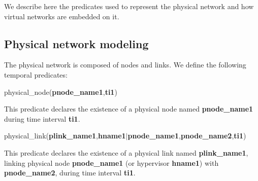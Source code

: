 We describe here the predicates used to represent the physical network and how virtual networks are embedded on it.




\subsection{Physical network modeling}


The physical network is composed of nodes and links. We define the following temporal predicates:
\begin{myformula}
physical\_node(\textbf{pnode\_name1},\textbf{ti1})
\end{myformula}

This predicate declares the existence of a physical node named \textbf{pnode\_name1} during time interval \textbf{ti1}.
\begin{myformula}
physical\_link(\textbf{plink\_name1},\textbf{hname1}$\vert$\textbf{pnode\_name1},\textbf{pnode\_name2},\textbf{ti1})
\end{myformula}

This predicate declares the existence of a physical link named \textbf{plink\_name1}, linking physical node \textbf{pnode\_name1} (or hypervisor \textbf{hname1}) with \textbf{pnode\_name2}, during time interval \textbf{ti1}.

